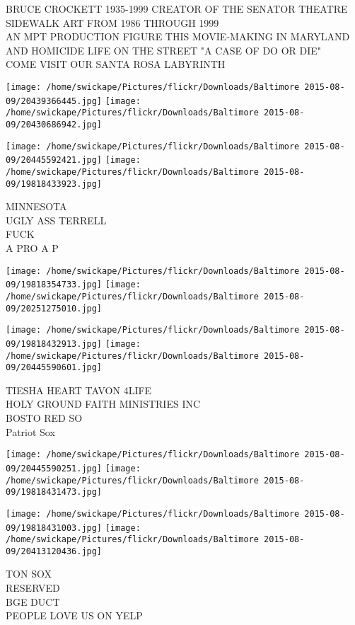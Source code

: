 \documentclass[10pt,letterpaper]{article}
\begin{document}
BRUCE CROCKETT 1935{-}1999 CREATOR OF THE SENATOR THEATRE SIDEWALK ART FROM 1986 THROUGH 1999\\
AN MPT PRODUCTION FIGURE THIS MOVIE{-}MAKING IN MARYLAND AND HOMICIDE LIFE ON THE STREET "A CASE OF DO OR DIE"\\
COME VISIT OUR SANTA ROSA LABYRINTH
\pagebreak

\texttt{[image: /home/swickape/Pictures/flickr/Downloads/Baltimore 2015-08-09/20439366445.jpg]}
\texttt{[image: /home/swickape/Pictures/flickr/Downloads/Baltimore 2015-08-09/20430686942.jpg]}

\texttt{[image: /home/swickape/Pictures/flickr/Downloads/Baltimore 2015-08-09/20445592421.jpg]}
\texttt{[image: /home/swickape/Pictures/flickr/Downloads/Baltimore 2015-08-09/19818433923.jpg]}

MINNESOTA\\
UGLY ASS TERRELL\\
FUCK\\
A PRO A P
\pagebreak

\texttt{[image: /home/swickape/Pictures/flickr/Downloads/Baltimore 2015-08-09/19818354733.jpg]}
\texttt{[image: /home/swickape/Pictures/flickr/Downloads/Baltimore 2015-08-09/20251275010.jpg]}

\texttt{[image: /home/swickape/Pictures/flickr/Downloads/Baltimore 2015-08-09/19818432913.jpg]}
\texttt{[image: /home/swickape/Pictures/flickr/Downloads/Baltimore 2015-08-09/20445590601.jpg]}

TIESHA HEART TAVON 4LIFE\\
HOLY GROUND FAITH MINISTRIES INC\\
BOSTO RED SO\\
Patriot Sox
\pagebreak

\texttt{[image: /home/swickape/Pictures/flickr/Downloads/Baltimore 2015-08-09/20445590251.jpg]}
\texttt{[image: /home/swickape/Pictures/flickr/Downloads/Baltimore 2015-08-09/19818431473.jpg]}

\texttt{[image: /home/swickape/Pictures/flickr/Downloads/Baltimore 2015-08-09/19818431003.jpg]}
\texttt{[image: /home/swickape/Pictures/flickr/Downloads/Baltimore 2015-08-09/20413120436.jpg]}

TON SOX\\
RESERVED\\
BGE DUCT\\
PEOPLE LOVE US ON YELP
\pagebreak
\end{document}
